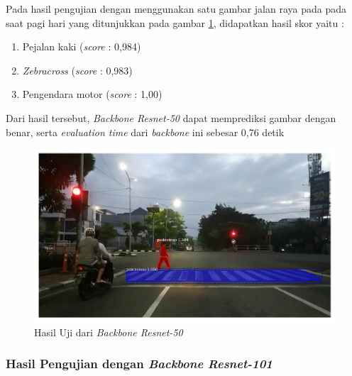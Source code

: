 Pada hasil pengujian dengan menggunakan satu gambar jalan raya pada pada saat pagi hari yang ditunjukkan pada gambar \ref{fig:hasil-resnet50}, didapatkan hasil skor yaitu :
\begin{enumerate}[nolistsep]
	\item Pejalan kaki (\textit{score} : 0,984)
	\item \textit{Zebracross} (\textit{score} : 0,983)
	\item Pengendara motor (\textit{score} : 1,00)
\end{enumerate}
Dari hasil tersebut, \textit{Backbone Resnet-50} dapat memprediksi gambar dengan benar, serta \textit{evaluation time} dari \textit{backbone} ini sebesar 0,76 detik
\begin{figure}[h] 
	\centering
	\includegraphics[scale=0.3]{gambar/hasil/resnet-50_fajar_800.png}
	\caption{Hasil Uji dari \textit{Backbone Resnet-50}}
	\label{fig:hasil-resnet50}
\end{figure}

\subsubsection{Hasil Pengujian dengan \textit{Backbone Resnet-101}}

